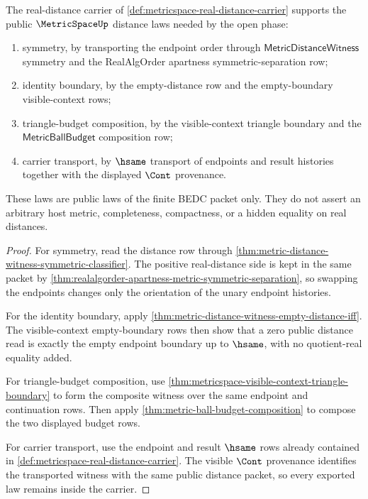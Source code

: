 \begin{theorem}
\label{thm:metricspace-public-law-package}
The real-distance carrier of
\autoref{def:metricspace-real-distance-carrier} supports the public
$\MetricSpaceUp$ distance laws needed by the open phase:
\begin{enumerate}
  \item symmetry, by transporting the endpoint order through
  $\mathsf{MetricDistanceWitness}$ symmetry and the RealAlgOrder apartness
  symmetric-separation row;
  \item identity boundary, by the empty-distance row and the empty-boundary
  visible-context rows;
  \item triangle-budget composition, by the visible-context triangle boundary
  and the $\mathsf{MetricBallBudget}$ composition row;
  \item carrier transport, by $\hsame$ transport of endpoints and result
  histories together with the displayed $\Cont$ provenance.
\end{enumerate}

These laws are public laws of the finite BEDC packet only. They do not assert
an arbitrary host metric, completeness, compactness, or a hidden equality on
real distances.
\end{theorem}
\begin{proof}
For symmetry, read the distance row through
\autoref{thm:metric-distance-witness-symmetric-classifier}. The positive
real-distance side is kept in the same packet by
\autoref{thm:realalgorder-apartness-metric-symmetric-separation}, so swapping
the endpoints changes only the orientation of the unary endpoint histories.

For the identity boundary, apply
\autoref{thm:metric-distance-witness-empty-distance-iff}. The visible-context
empty-boundary rows then show that a zero public distance read is exactly the
empty endpoint boundary up to $\hsame$, with no quotient-real equality added.

For triangle-budget composition, use
\autoref{thm:metricspace-visible-context-triangle-boundary} to form the
composite witness over the same endpoint and continuation rows. Then apply
\autoref{thm:metric-ball-budget-composition} to compose the two displayed
budget rows.

For carrier transport, use the endpoint and result $\hsame$ rows already
contained in \autoref{def:metricspace-real-distance-carrier}. The visible
$\Cont$ provenance identifies the transported witness with the same public
distance packet, so every exported law remains inside the carrier.
\end{proof}

